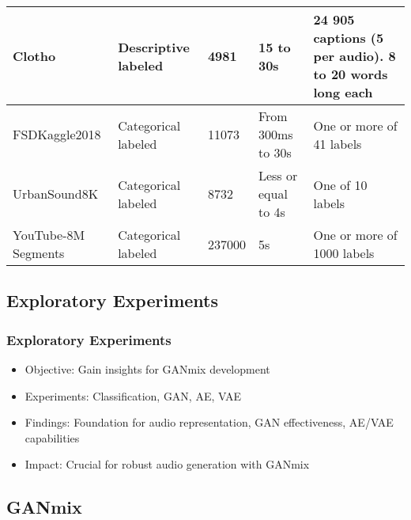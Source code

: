 \begin{frame}
\begin{table}[ht]
\begin{tabularx}{\textwidth}{|X|X|X|X|X|}
            Clotho \cite{drossos_clotho_2019}                       &
            Descriptive labeled                                     &
            4981                                                    &
            15 to 30s                                               &
            24 905 captions (5 per audio). 8 to 20 words long each    \\ \hline

            FSDKaggle2018 \cite{fonseca_general-purpose_2018}       &
            Categorical labeled                                     &
            11073                                                   &
            From 300ms to 30s                                       &
            One or more of 41 labels                                  \\ \hline

            UrbanSound8K \cite{salamon_dataset_2014}                &
            Categorical labeled                                     &
            8732                                                    &
            Less or equal to 4s                                     &
            One of 10 labels                                          \\ \hline

            YouTube-8M Segments \cite{abu-el-haija_youtube-8m_2016} &
            Categorical labeled                                     &
            237000                                                  &
            5s                                                      &
            One or more of 1000 labels                                \\ \hline
        \end{tabularx}
    \end{table}
\end{frame}


\subsection{Exploratory Experiments}

\begin{frame}
    \frametitle{Exploratory Experiments}
    
    \begin{itemize}
        \item Objective: Gain insights for GANmix development
        \item Experiments: Classification, GAN, AE, VAE
        \item Findings: Foundation for audio representation, GAN effectiveness, AE/VAE capabilities
        \item Impact: Crucial for robust audio generation with GANmix
    \end{itemize}

\end{frame}

\subsection{GANmix}